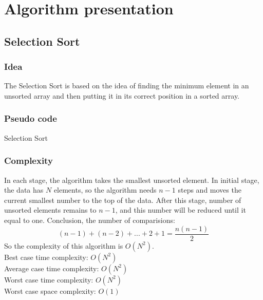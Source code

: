 \documentclass[11pt,a4paper]{article}
\begin{document}
\section{Algorithm presentation}
\subsection{Selection Sort}

\subsubsection*{Idea}
The Selection Sort is based on the idea of finding the minimum element in an unsorted array and then putting it in its correct position in a sorted array.

\subsubsection*{Pseudo code}
\begin{algorithm2e}
  \SetAlgoLined
  \caption{Selection Sort}
\end{algorithm2e}

\subsubsection*{Complexity}
In each stage, the algorithm takes the smallest unsorted element. In initial stage, the data has $N$ elements, so the algorithm needs $n-1$ steps and 
moves the current smallest number to the top of the data. After this stage, number of unsorted elements remains to $n-1$, and this number will be reduced until it equal to one.
Conclusion, the number of comparisions:
\newline
$$(n-1) + (n-2) + ... + 2 + 1 = \dfrac{n(n-1)}{2}$$
\newline
So the complexity of this algorithm is $O(N^2)$.\\
Best case time complexity: $O(N^2)$ \\
Average case time complexity: $O(N^2)$\\
Worst case time complexity: $O(N^2)$ \\
Worst case space complexity: $O(1)$
\end{document}
